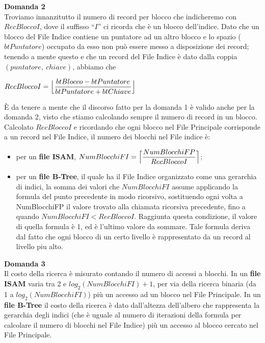   \noindent\textbf{\fontsize{14pt}{1em}Domanda 2}\\
  Troviamo innanzitutto il numero di record per blocco che indicheremo con $RecBloccoI$, dove il suffisso ``$I$''
  ci ricorda che è un blocco dell'indice. Dato che un blocco del File Indice contiene un puntatore ad un altro blocco
  e lo spazio ($btPuntatore$) occupato da esso non può essere messo a disposizione dei record; tenendo a mente questo e che un record
  del File Indice è dato dalla coppia $(puntatore,\ chiave)$, abbiamo che
  \begin{center}
   $RecBloccoI = \Bigl\lfloor \dfrac{btBlocco - btPuntatore}{btPuntatore + btChiave}\Bigr\rfloor$
  \end{center}
  \`E da tenere a mente che il discorso fatto per la domanda 1 è valido anche per la domanda 2, visto che stiamo calcolando
  sempre il numero di record in un blocco.\\
  
  Calcolato $RecBloccoI$ e ricordando che ogni blocco nel File Principale corrisponde a un record nel File Indice, il numero 
  dei blocchi nel File indice è:
  \begin{itemize}
   \item per un \textbf{file ISAM}, $NumBlocchiFI = \Bigl\lceil \dfrac{NumBlocchiFP}{RecBloccoI}\Bigr\rceil$;
   \item per un \textbf{file B-Tree}, il quale ha il File Indice organizzato come una gerarchia di indici,
   la somma dei valori che $NumBlocchiFI$ assume applicando la formula del punto precedente
   in modo ricorsivo, sostituendo ogni volta a NumBlocchiFP il valore trovato alla chiamata ricorsiva precedente, fino a quando
   $NumBlocchiFI < RecBloccoI$. Raggiunta questa condizione, il valore di quella formula è 1, ed è l'ultimo valore da sommare.
   Tale formula deriva dal fatto che ogni blocco di un certo livello è rappresentato da un record al livello piu alto.
  \end{itemize}
  
  \noindent\textbf{\fontsize{14pt}{1em}Domanda 3}\\
  Il costo della ricerca è misurato contando il numero di accessi a blocchi. In un \textbf{file ISAM} varia tra 2 e 
  $log_2(NumBlocchiFI) + 1$, per via della ricerca binaria (da 1 a $log_2(NumBlocchiFI)$) più un accesso ad un blocco
  nel File Principale. In un \textbf{file B-Tree} il costo della ricerca è dato dall'altezza dell'albero che rappresenta
  la gerarchia degli indici (che è uguale al numero di iterazioni della formula per calcolare il 
  numero di blocchi nel File Indice) più un accesso al blocco cercato nel File Principale.\\
  
